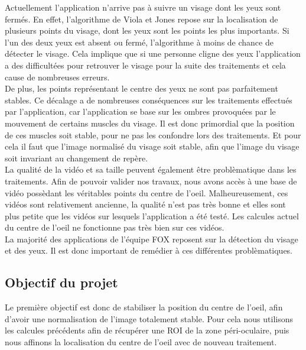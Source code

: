 Actuellement l'application n'arrive pas à suivre un visage dont les yeux sont fermés. En effet,
l'algorithme de Viola et Jones repose sur la localisation de plusieurs points du visage, dont 
les yeux sont les points les plus importants. Si l'un des deux yeux est absent ou fermé, l'algorithme 
à moins de chance de détecter le visage. Cela implique que si une personne cligne des yeux
l'application a des difficultées pour retrouver le visage pour la suite des traitements et cela 
cause de nombreuses erreurs.\\

De plus, les points représentant le centre des yeux ne sont pas parfaitement stables. Ce décalage a de 
nombreuses conséquences sur les traitements effectués par l'application, car l'application se base sur 
les ombres provoquées par le mouvement de certains muscles du 
visage. Il est donc primordial que la position de ces muscles soit stable, pour ne pas les confondre
lors des traitements. Et pour cela il faut que l'image normalisé du visage soit stable, afin que l'image
du visage soit invariant au changement de repère.\\

La qualité de la vidéo et sa taille peuvent également être problèmatique dans les traitements. Afin de
pouvoir valider nos travaux, nous avons accès à une base de vidéo possèdant les véritables points
du centre de l'oeil. Malheureusement, ces vidéos sont relativement ancienne, la qualité n'est pas 
très bonne et elles sont plus petite que les vidéos sur lesquels l'application a été testé. Les 
calcules actuel du centre de l'oeil ne fonctionne pas très bien sur ces vidéos.\\

La majorité des applications de l'équipe FOX reposent sur la détection du visage et des yeux. Il est donc 
important de remédier à ces différentes problèmatiques.\\

\subsection{Objectif du projet}

Le première objectif est donc de stabiliser la position du centre de l'oeil, afin d'avoir une normalisation de l'image
totalement stable. Pour cela nous utilisons les calcules précédents afin de récupérer une ROI de la zone péri-oculaire, puis
nous affinons la localisation du centre de l'oeil avec de nouveau traitement.\\

